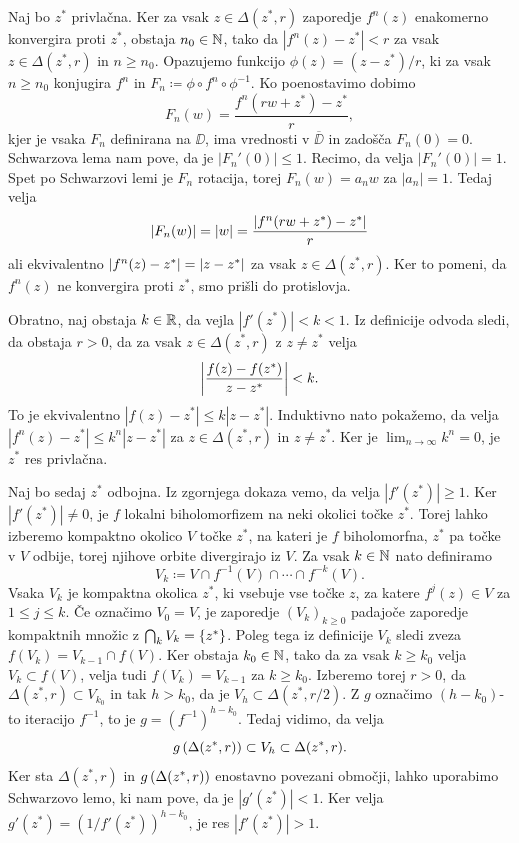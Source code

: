 \begin{dokaz}
    Naj bo \(z^*\) privlačna. Ker za vsak \(z \in \Delta (z^*, r)\) zaporedje \(f^n (z)\) enakomerno konvergira proti \(z^*\), obstaja \(n_0 \in \mathbb N\), tako da \(|f^n (z) - z^*| < r\) za vsak \(z \in \Delta (z^*, r)\) in \(n \geq n_0\). Opazujemo funkcijo \(\phi (z) = (z - z^*) / r\), ki za vsak \(n \geq n_0\) konjugira \(f^n\) in \(F_n \coloneq \phi \circ f^n \circ \phi^{-1}\). Ko poenostavimo dobimo
    \[F_n (w) = \frac{f^n (r w + z^*) - z^*}{r},\]
    kjer je vsaka \(F_n\) definirana na \(\DD\), ima vrednosti v \(\overline{\DD}\) in zadošča \(F_n (0) = 0\). Schwarzova lema nam pove, da je \(|F_n' (0)| \leq 1\). Recimo, da velja \(|F_n' (0)| = 1\). Spet po Schwarzovi lemi je \(F_n\) rotacija, torej \(F_n (w) = a_n w\) za \(|a_n| = 1\). Tedaj velja
    \[\left\lvert F_n (w)\right\rvert = \left\lvert w\right\rvert = \frac{\left\lvert f^n (r w + z^*) - z^*\right\rvert}{r}\]
    ali ekvivalentno \(\left\lvert f^n (z) - z^*\right\rvert = \left\lvert z - z^*\right\rvert\) za vsak \(z \in \Delta (z^*, r)\). Ker to pomeni, da \(f^n (z)\) ne konvergira proti \(z^*\), smo prišli do protislovja.

    Obratno, naj obstaja \(k \in \mathbb R\), da vejla \(|f' (z^*)| < k < 1\). Iz definicije odvoda sledi, da obstaja \(r > 0\), da za vsak \(z \in \Delta (z^*, r)\) z \(z \neq z^*\) velja
    \[\left\lvert\frac{f (z) - f (z^*)}{z - z^*}\right\rvert < k.\]
    To je ekvivalentno \(|f (z) - z^*| \leq k |z - z^*|\). Induktivno nato pokažemo, da velja \(|f^n (z) - z^*| \leq k^n |z - z^*|\) za \(z \in \Delta (z^*, r)\) in \(z \neq z^*\). Ker je \(\lim_{n \to \infty} k^n = 0\), je \(z^*\) res privlačna.

    Naj bo sedaj \(z^*\) odbojna. Iz zgornjega dokaza vemo, da velja \(|f' (z^*)| \geq 1\). Ker \(|f' (z^*)| \neq 0\), je \(f\) lokalni biholomorfizem na neki okolici točke \(z^*\). Torej lahko izberemo kompaktno okolico \(V\) točke \(z^*\), na kateri je \(f\) biholomorfna, \(z^*\) pa točke v \(V\) odbije, torej njihove orbite divergirajo iz \(V\). Za vsak \(k \in \mathbb N\) nato definiramo
    \[V_k \coloneq V \cap f^{-1} (V) \cap \cdots \cap f^{- k} (V).\]
    Vsaka \(V_k\) je kompaktna okolica \(z^*\), ki vsebuje vse točke \(z\), za katere \(f^j (z) \in V\) za \(1 \leq j \leq k\). Če označimo \(V_0 = V\), je zaporedje \((V_k)_{k \geq 0}\) padajoče zaporedje kompaktnih množic z \(\bigcap_k V_k = \left\{ z^* \right\}\). Poleg tega iz definicije \(V_k\) sledi zveza \(f (V_k) = V_{k - 1} \cap f (V)\). Ker obstaja \(k_0 \in \mathbb N\), tako da za vsak \(k \geq k_0\) velja \(V_k \subset f (V)\), velja tudi \(f (V_k) = V_{k - 1}\) za \(k \geq k_0\). Izberemo torej \(r > 0\), da \(\Delta (z^*, r) \subset V_{k_0}\) in tak \(h > k_0\), da je \(V_h \subset \Delta (z^*, r / 2)\). Z \(g\) označimo \((h - k_0)\)-to iteracijo \(f^{-1}\), to je \(g = (f^{-1})^{h - k_0}\). Tedaj vidimo, da velja
    \[g \left( \Delta (z^*, r) \right) \subset V_h \subset \Delta (z^*, r).\]
    Ker sta \(\Delta (z^*, r)\) in \(g \left( \Delta (z^*, r) \right)\) enostavno povezani območji, lahko uporabimo Schwarzovo lemo, ki nam pove, da je \(|g' (z^*)| < 1\). Ker velja \(g' (z^*) = (1 / f' (z^*))^{h - k_0}\), je res \(|f' (z^*)| > 1\).


\end{dokaz}

